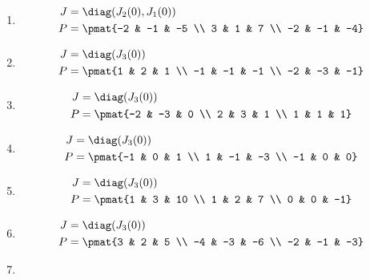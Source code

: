 \begin{enumerate}
\item

\begin{align*}
J &= \diag(J_{2}(0), J_{1}(0))\\
P &= \pmat{-2 & -1 & -5 \\ 3 & 1 & 7 \\ -2 & -1 & -4}
\end{align*}

\item

\begin{align*}
J &= \diag(J_{3}(0))\\
P &= \pmat{1 & 2 & 1 \\ -1 & -1 & -1 \\ -2 & -3 & -1}
\end{align*}

\item

\begin{align*}
J &= \diag(J_{3}(0))\\
P &= \pmat{-2 & -3 & 0 \\ 2 & 3 & 1 \\ 1 & 1 & 1}
\end{align*}

\item

\begin{align*}
J &= \diag(J_{3}(0))\\
P &= \pmat{-1 & 0 & 1 \\ 1 & -1 & -3 \\ -1 & 0 & 0}
\end{align*}

\item

\begin{align*}
J &= \diag(J_{3}(0))\\
P &= \pmat{1 & 3 & 10 \\ 1 & 2 & 7 \\ 0 & 0 & -1}
\end{align*}

\item

\begin{align*}
J &= \diag(J_{3}(0))\\
P &= \pmat{3 & 2 & 5 \\ -4 & -3 & -6 \\ -2 & -1 & -3}
\end{align*}

\item


\end{enumerate}
